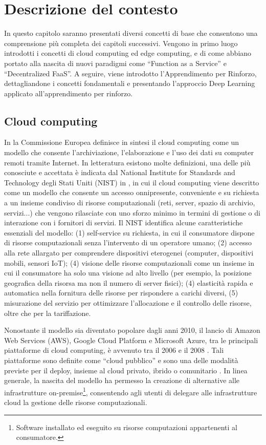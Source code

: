 \chapter{Descrizione del contesto}
\label{sec:2_descrizione_contesto}

In questo capitolo saranno presentati diversi concetti di base che consentono una comprensione più completa dei capitoli successivi. Vengono in primo luogo introdotti i concetti di cloud computing ed edge computing, e di come abbiano portato alla nascita di nuovi paradigmi come ``Function as a Service'' e ``Decentralized FaaS''. A seguire, viene introdotto l'Apprendimento per Rinforzo, dettagliandone i concetti fondamentali e presentando l'approccio Deep Learning applicato all'apprendimento per rinforzo.

\section{Cloud computing}

In \cite{Europe2012} la Commissione Europea definisce in sintesi il cloud computing come un modello che consente l'archiviazione, l'elaborazione e l'uso dei dati su computer remoti tramite Internet. In letteratura esistono molte definizioni, una delle più conosciute e accettata è indicata dal National Institute for Standards and Technology degli Stati Uniti (NIST) in \cite{Nist2011}, in cui il cloud computing viene descritto come un modello che consente un accesso onnipresente, conveniente e su richiesta a un insieme condiviso di risorse computazionali (reti, server, spazio di archivio, servizi...) che vengono rilasciate con uno sforzo minimo in termini di gestione o di interazione con i fornitori di servizi. Il NIST identifica alcune caratteristiche essenziali del modello: (1) self-service su richiesta, in cui il consumatore dispone di risorse computazionali senza l'intervento di un operatore umano; (2) accesso alla rete allargato per comprendere dispositivi eterogenei (computer, dispositivi mobili, sensori IoT); (4) visione delle risorse computazionali come un insieme in cui il consumatore ha solo una visione ad alto livello (per esempio, la posizione geografica della risorsa ma non il numero di server fisici); (4) elasticità rapida e automatica nella fornitura delle risorse per rispondere a carichi diversi, (5) misurazione del servizio per ottimizzare l'allocazione e il controllo delle risorse, oltre che per la tariffazione.

Nonostante il modello sia diventato popolare dagli anni 2010, il lancio di Amazon Web Services (AWS), Google Cloud Platform e Microsoft Azure, tra le principali piattaforme di cloud computing, è avvenuto tra il 2006 e il 2008  \cite{Amazon2006, McDonald2008, Roosevelt2022}. Tali piattaforme sono definite come ``cloud pubblico'' e sono una delle modalità previste per il deploy, insieme al cloud privato, ibrido o comunitario \cite{Nist2011}. In linea generale, la nascita del modello ha permesso la creazione di alternative alle infrastrutture on-premise\footnote{Software installato ed eseguito su risorse computazioni appartenenti al consumatore.}, consentendo agli utenti di delegare alle infrastrutture cloud la gestione delle risorse computazionali.

